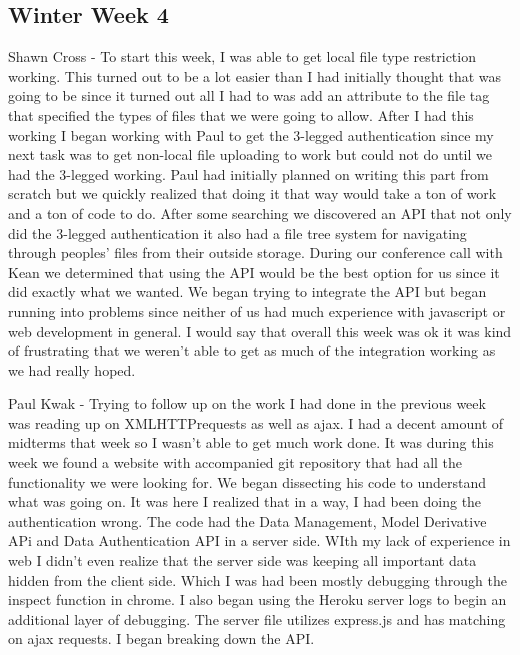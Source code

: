 \documentclass[10pt,draftclsnofoot,onecolumn]{IEEEtran}
\begin{document}
\subsection{Winter Week 4}
Shawn Cross - To start this week, I was able to get local file type restriction working. This turned out to be a lot easier than I had initially thought that was going to be since it turned out all I had to was add an attribute to the file tag that specified the types of files that we were going to allow. After I had this working I began working with Paul to get the 3-legged authentication since my next task was to get non-local file uploading to work but could not do until we had the 3-legged working. Paul had initially planned on writing this part from scratch but we quickly realized that doing it that way would take a ton of work and a ton of code to do. After some searching we discovered an API that not only did the 3-legged authentication it also had a file tree system for navigating through peoples' files from their outside storage. During our conference call with Kean we determined that using the API would be the best option for us since it did exactly what we wanted. We began trying to integrate the API but began running into problems since neither of us had much experience with javascript or web development in general. I would say that overall this week was ok it was kind of frustrating that we weren't able to get as much of the integration working as we had really hoped. 

Paul Kwak - Trying to follow up on the work I had done in the previous week was reading up on XMLHTTPrequests as well as ajax. I had a decent amount of midterms that week so I wasn't able to get much work done. It was during this week we found a website with accompanied git repository that had all the functionality we were looking for. We began dissecting his code to understand what was going on. It was here I realized that  in a way, I had been doing the authentication wrong. The code had the Data Management, Model Derivative APi and Data Authentication API in a server side. WIth my lack of experience in web I didn't even realize that the server side was keeping all important data hidden from the client side. Which I was had been mostly debugging through the inspect function in chrome. I also began using the Heroku server logs to begin an additional layer of debugging. The server file utilizes express.js and has matching on ajax requests. I began breaking down the API.
\end{document}
